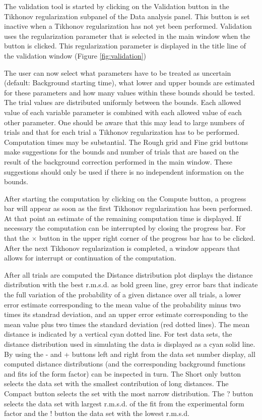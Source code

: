 \documentclass{article}
\begin{document}
The validation tool is started by clicking on the {\ttfamily Validation} button in the {\ttfamily Tikhonov regularization} subpanel of the {\ttfamily Data analysis} panel. This button is set inactive when a Tikhonov regularization has not yet been performed. Validation uses the regularization parameter that is selected in the main window when the button is clicked. This regularization parameter is displayed in the title line of the validation window (Figure \ref{fig:validation}) 

The user can now select what parameters have to be treated as uncertain (default: Background starting time), what lower and upper bounds are estimated for these parameters and how many values within these bounds should be tested. The trial values are distributed uniformly between the bounds. Each allowed value of each variable parameter is combined with each allowed value of each other parameter. One should be aware that this may lead to large numbers of trials and that for each trial a Tikhonov regularization has to be performed. Computation times may be substantial. The {\ttfamily Rough grid} and {\ttfamily Fine grid} buttons make suggestions for the bounds and number of trials that are based on the result of the background correction performed in the main window. These suggestions should only be used if there is no independent information on the bounds.

After starting the computation by clicking on the {\ttfamily Compute} button, a progress bar will appear as soon as the first Tikhonov regularization has been performed. At that point an estimate of the remaining computation time is displayed. If necessary the computation can be interrupted by closing the progress bar. For that the $\times$ button in the upper right corner of the progress bar has to be clicked. After the next Tikhonov regularization is completed, a window appears that allows for interrupt or continuation of the computation.

After all trials are computed the {\ttfamily Distance distribution} plot displays the distance distribution with the best r.m.s.d. as bold green line, grey error bars that indicate the full variation of the probability of a given distance over all trials, a lower error estimate corresponding to the mean value of the probability minus two times its standrad deviation, and an upper error estimate corresponding to the mean value plus two times the standard deviation (red dotted lines). The mean distance is indicated by a vertical cyan dotted line. For test data sets, the distance distribution used in simulating the data is displayed as a cyan solid line. By using the {\ttfamily -} and {\ttfamily +} buttons left and right from the data set number display, all computed distance distributions (and the corresponding background functions and fits iof the form factor) can be inspected in turn. The {\ttfamily Short only} button selects the data set with the smallest contribution of long distances. The {\ttfamily Compact} button selects the set with the most narrow distribution. The {\ttfamily ?} button selects the data set with largest r.m.s.d. of the fit from the experimental form factor and the {\ttfamily !} button the data set with the lowest r.m.s.d. 
\end{document}
